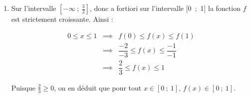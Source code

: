 \documentclass[10pt]{article}
\begin{document}
\begin{enumerate}
\begin{center}
\end{center}

\item Sur l'intervalle $[- \infty~;~\frac32]$, donc a fortiori sur l'intervalle [0~;~1] la fonction $f$ est strictement croissante. Ainsi :

\[\begin{array}{rcl}
0 \leqslant x \leqslant 1 &\implies& f(0) \leqslant f(x) \leqslant f(1) \\
&\implies& \dfrac{-2}{-3} \leqslant f(x) \leqslant \dfrac{-1}{-1} \\
&\implies& \dfrac{2}{3} \leqslant f(x) \leqslant 1
\end{array}\]

Puisque $\frac{2}{3} \geqslant 0$, on en déduit que pour tout $x \in [0~;~1]$,\: $f(x) \in [0~;~1]$.
\end{enumerate}

\medskip
\end{document}
